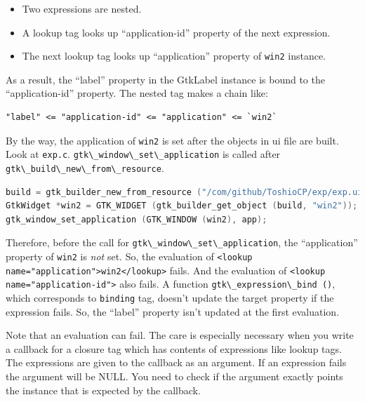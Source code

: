 \begin{itemize}
\tightlist
\item
  Two expressions are nested.
\item
  A lookup tag looks up ``application-id'' property of the next
  expression.
\item
  The next lookup tag looks up ``application'' property of
  \passthrough{\lstinline!win2!} instance.
\end{itemize}

As a result, the ``label'' property in the GtkLabel instance is bound to
the ``application-id'' property. The nested tag makes a chain like:

\begin{lstlisting}
"label" <= "application-id" <= "application" <= `win2`
\end{lstlisting}

By the way, the application of \passthrough{\lstinline!win2!} is set
after the objects in ui file are built. Look at
\passthrough{\lstinline!exp.c!}.
\passthrough{\lstinline!gtk\_window\_set\_application!} is called after
\passthrough{\lstinline!gtk\_build\_new\_from\_resource!}.

\begin{lstlisting}[language=C]
build = gtk_builder_new_from_resource ("/com/github/ToshioCP/exp/exp.ui");
GtkWidget *win2 = GTK_WIDGET (gtk_builder_get_object (build, "win2"));
gtk_window_set_application (GTK_WINDOW (win2), app);
\end{lstlisting}

Therefore, before the call for
\passthrough{\lstinline!gtk\_window\_set\_application!}, the
``application'' property of \passthrough{\lstinline!win2!} is \emph{not}
set. So, the evaluation of
\passthrough{\lstinline!<lookup name="application">win2</lookup>!}
fails. And the evaluation of
\passthrough{\lstinline!<lookup name="application-id">!} also fails. A
function \passthrough{\lstinline!gtk\_expression\_bind ()!}, which
corresponds to \passthrough{\lstinline!binding!} tag, doesn't update the
target property if the expression fails. So, the ``label'' property
isn't updated at the first evaluation.

Note that an evaluation can fail. The care is especially necessary when
you write a callback for a closure tag which has contents of expressions
like lookup tags. The expressions are given to the callback as an
argument. If an expression fails the argument will be NULL. You need to
check if the argument exactly points the instance that is expected by
the callback.

